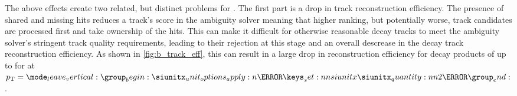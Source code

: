 The above effects create two related, but distinct problems for \btagging.
The first part is a drop in track reconstruction efficiency.
The presence of shared and missing hits reduces a track's score in the ambiguity solver meaning that higher ranking, but potentially worse, track candidates are processed first and take ownership of the hits.
This can make it difficult for otherwise reasonable \bhadron decay tracks to meet the ambiguity solver's stringent track quality requirements, leading to their rejection at this stage and an overall descrease in the \bhadron decay track reconstruction efficiency.
As shown in \cref{fig:b_track_eff}, this can result in a large drop in reconstruction efficiency for \bhadron decay products of up to  for at $\pt = \SI{2}{\TeV}$.

